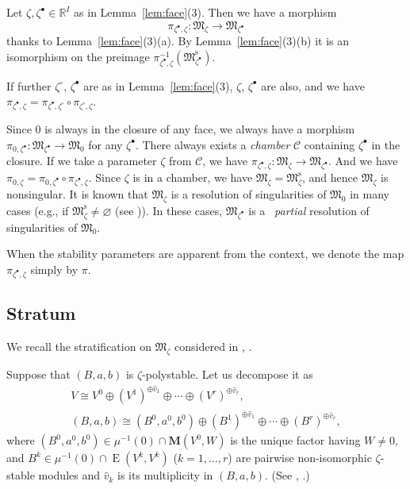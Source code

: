 \documentclass[10pt,a4paper]{amsart}
\theoremstyle{definition}
\numberwithin{equation}{section}
\newcommand{\lemref}[1]{Lemma~\ref{#1}}
\newcommand{\R}{{\mathbb R}}
\newcommand{\bM}{{\mathbf M}} %
\newcommand{\M}{{\mathfrak M}} %
\newcommand{\Mreg}{\M^{\operatorname{s}}}
\newcommand{\HomE}{\operatorname{E}}
\begin{document}
Let $\zeta,\zeta^\bullet\in\R^I$ as in \lemref{lem:face}(3). Then we have a
morphism
\begin{equation*}
   \pi_{\zeta^\bullet,\zeta} \colon \M_\zeta \to \M_{\zeta^\bullet}
\end{equation*}
thanks to \lemref{lem:face}(3)(a). By \lemref{lem:face}(3)(b) it is an
isomorphism on the preimage $\pi_{\zeta^\bullet,\zeta}^{-1}(\Mreg_{\zeta^\bullet})$.

If further $\zeta^\circ$, $\zeta^\bullet$ are as in \lemref{lem:face}(3),
$\zeta$, $\zeta^\bullet$ are also, and we have
\(
  \pi_{\zeta^\bullet,\zeta} = \pi_{\zeta^\bullet,\zeta^\circ}
  \circ \pi_{\zeta^\circ,\zeta}.
\)

Since $0$ is always in the closure of any face, we always have a
morphism
\(
  \pi_{0,\zeta^\bullet}\colon \M_{\zeta^\bullet}\to \M_0
\)
for any $\zeta^\bullet$. There always exists a {\it chamber\/} $\mathcal C$
containing $\zeta^\bullet$ in the closure. If we take a parameter $\zeta$
from $\mathcal C$, we have
\(
  \pi_{\zeta^\bullet,\zeta}\colon \M_{\zeta}\to \M_{\zeta^\bullet}.
\)
And we have $\pi_{0,\zeta} =
\pi_{0,\zeta^\bullet}\circ\pi_{\zeta^\bullet,\zeta}$. Since
$\zeta$ is in a chamber, we have $\M_{\zeta} = \Mreg_{\zeta}$, and
hence $\M_{\zeta}$ is nonsingular. It is known that
$\M_{\zeta}$ is a resolution of singularities of $\M_0$ in many cases
(e.g., if $\Mreg_{\zeta}\neq\varnothing$ (see
\cite[Theorem~4.1]{Na-quiver})). In these cases, $\M_{\zeta^\bullet}$ is a~{\it
  partial} resolution of singularities of $\M_0$.

When the stability parameters are apparent from the context, we denote
the map $\pi_{\zeta^\bullet,\zeta}$ simply by $\pi$.

\subsection{Stratum}\label{subsec:stratum}

We recall the stratif\/ication on $\M_\zeta$ considered in
\cite[Section~6]{Na-quiver}, \cite[Section~3]{Na-alg}.

Suppose that $(B,a,b)$ is $\zeta$-polystable. Let us decompose it as
\begin{gather}
     V \cong V^0 \oplus (V^1)^{\oplus {\widehat v}_1}\oplus \cdots \oplus
   (V^r)^{\oplus {\widehat v}_r},
\nonumber\\
     (B,a,b) \cong (B^0,a^0,b^0) \oplus
   (B^1)^{\oplus {\widehat v}_1} \oplus \cdots \oplus
   (B^r)^{\oplus {\widehat v}_r},\label{eq:decomp}
\end{gather}
where $(B^0,a^0,b^0)\in\mu^{-1}(0)\cap\bM(V^0,W)$ is the unique factor
having $W\neq 0$, and $B^k\in \mu^{-1}(0)\cap\HomE(V^k,V^k)$
($k=1,\dots,r$) are pairwise non-isomorphic $\zeta$-stable modules
and ${\widehat v}_k$ is its multiplicity in $(B,a,b)$. (See
\cite[6.5]{Na-quiver}, \cite[3.27]{Na-alg}.)
\end{document}
